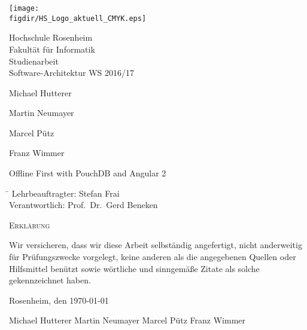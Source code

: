 \begin{titlepage}

\sffamily

\raggedleft

\texttt{[image: \\figdir/HS\_Logo\_aktuell\_CMYK.eps]}

\vfill

\centering
\Large
Hochschule Rosenheim\\
Fakultät für Informatik
\vspace{2cm}\\
 \Large
Studienarbeit\vspace{1cm}\\
 \Large
 Software-Architektur WS 2016/17 \\
 \Large

\vspace*{\fill}

Michael Hutterer

Martin Neumayer

Marcel Pütz

Franz Wimmer 

\vspace{1cm}

 \LARGE

Offline First with PouchDB and Angular 2
\vspace{1cm}

\flushleft
 \Large
\vspace*{\fill}

\begin{tabbing}
\hspace*{4cm}\= \kill
Lehrbeauftragter:\> Stefan Frai\\
Verantwortlich:\> Prof.\ Dr.\ Gerd Beneken\\
\end{tabbing}

\end{titlepage}

\cleardoubleemptypage

{
\large
\thispagestyle{empty}
\vspace*{\fill}

\noindent
\textsc{Erklärung}

\medskip

\noindent
Wir versicheren, dass wir diese Arbeit selbständig
angefertigt, nicht anderweitig für Prüfungszwecke
vorgelegt, keine anderen als die angegebenen Quellen
oder Hilfsmittel benützt sowie wörtliche und
sinngemäße Zitate als solche gekennzeichnet haben.

\bigskip

\noindent
Rosenheim, den \today

\vspace*{2cm}

\noindent
 Michael Hutterer\hspace{.8cm} Martin Neumayer \hspace{.8cm} Marcel Pütz \hspace{.8cm} Franz Wimmer\\
}

